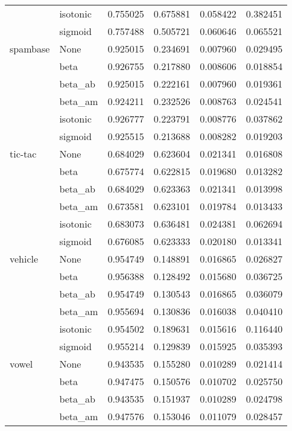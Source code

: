 \begin{tabular}{llrrrr}
        & isotonic &  0.755025 &  0.675881 &  0.058422 &  0.382451 \\
        & sigmoid &  0.757488 &  0.505721 &  0.060646 &  0.065521 \\
spambase & None &  0.925015 &  0.234691 &  0.007960 &  0.029495 \\
        & beta &  0.926755 &  0.217880 &  0.008606 &  0.018854 \\
        & beta\_ab &  0.925015 &  0.222161 &  0.007960 &  0.019361 \\
        & beta\_am &  0.924211 &  0.232526 &  0.008763 &  0.024541 \\
        & isotonic &  0.926777 &  0.223791 &  0.008776 &  0.037862 \\
        & sigmoid &  0.925515 &  0.213688 &  0.008282 &  0.019203 \\
tic-tac & None &  0.684029 &  0.623604 &  0.021341 &  0.016808 \\
        & beta &  0.675774 &  0.622815 &  0.019680 &  0.013282 \\
        & beta\_ab &  0.684029 &  0.623363 &  0.021341 &  0.013998 \\
        & beta\_am &  0.673581 &  0.623101 &  0.019784 &  0.013433 \\
        & isotonic &  0.683073 &  0.636481 &  0.024381 &  0.062694 \\
        & sigmoid &  0.676085 &  0.623333 &  0.020180 &  0.013341 \\
vehicle & None &  0.954749 &  0.148891 &  0.016865 &  0.026827 \\
        & beta &  0.956388 &  0.128492 &  0.015680 &  0.036725 \\
        & beta\_ab &  0.954749 &  0.130543 &  0.016865 &  0.036079 \\
        & beta\_am &  0.955694 &  0.130836 &  0.016038 &  0.040410 \\
        & isotonic &  0.954502 &  0.189631 &  0.015616 &  0.116440 \\
        & sigmoid &  0.955214 &  0.129839 &  0.015925 &  0.035393 \\
vowel & None &  0.943535 &  0.155280 &  0.010289 &  0.021414 \\
        & beta &  0.947475 &  0.150576 &  0.010702 &  0.025750 \\
        & beta\_ab &  0.943535 &  0.151937 &  0.010289 &  0.024798 \\
        & beta\_am &  0.947576 &  0.153046 &  0.011079 &  0.028457 \\

\end{tabular}
